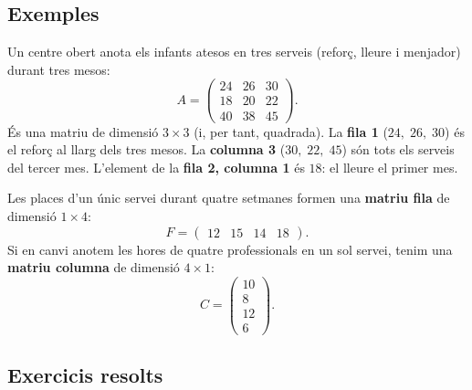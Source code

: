 \subsection{Exemples}

\begin{exemple}
Un centre obert anota els infants atesos en tres serveis (reforç, lleure i menjador)
durant tres mesos:
\[
A=\begin{pmatrix} 24 & 26 & 30 \\ 18 & 20 & 22 \\ 40 & 38 & 45 \end{pmatrix}.
\]
És una matriu de dimensió $3\times 3$ (i, per tant, quadrada). La \textbf{fila 1}
($24,\;26,\;30$) és el reforç al llarg dels tres mesos. La \textbf{columna 3}
($30,\;22,\;45$) són tots els serveis del tercer mes. L'element de la
\textbf{fila 2, columna 1} és $18$: el lleure el primer mes.
\end{exemple}

\begin{exemple}
Les places d'un únic servei durant quatre setmanes formen una \textbf{matriu fila}
de dimensió $1\times 4$:
\[
F=\begin{pmatrix} 12 & 15 & 14 & 18 \end{pmatrix}.
\]
Si en canvi anotem les hores de quatre professionals en un sol servei, tenim una
\textbf{matriu columna} de dimensió $4\times 1$:
\[
C=\begin{pmatrix} 10 \\ 8 \\ 12 \\ 6 \end{pmatrix}.
\]
\end{exemple}

\subsection{Exercicis resolts}

